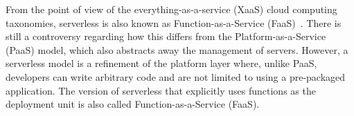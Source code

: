 From the point of view of the everything-as-a-service (XaaS) cloud computing taxonomies, serverless is also known as Function-as-a-Service (FaaS)~\cite{2 MateosFaas}. There is still a controversy regarding how this differs from the Platform-as-a-Service (PaaS) model, which also abstracts away the management of servers. However, a serverless model is a refinement of the platform layer where, unlike PaaS, developers can write arbitrary code and are not limited to using a pre-packaged application. The version of serverless that explicitly uses functions as the
deployment unit is also called Function-as-a-Service (FaaS).

